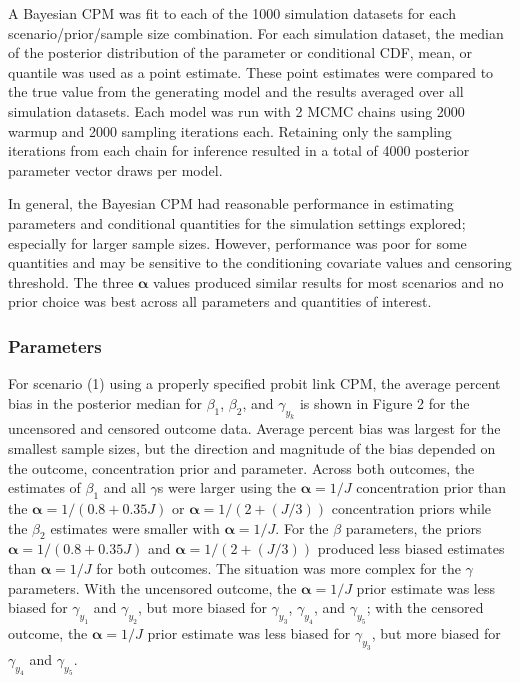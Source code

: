 \documentclass[
]{article}
\begin{document}
A Bayesian CPM was fit to each of the 1000 simulation datasets for each scenario/prior/sample size combination. For each simulation dataset, the median of the posterior distribution of the parameter or conditional CDF, mean, or quantile was used as a point estimate. These point estimates were compared to the true value from the generating model and the results averaged over all simulation datasets. Each model was run with 2 MCMC chains using 2000 warmup and 2000 sampling iterations each. Retaining only the sampling iterations from each chain for inference resulted in a total of 4000 posterior parameter vector draws per model.

In general, the Bayesian CPM had reasonable performance in estimating parameters and conditional quantities for the simulation settings explored; especially for larger sample sizes. However, performance was poor for some quantities and may be sensitive to the conditioning covariate values and censoring threshold. The three \(\boldsymbol{\alpha}\) values produced similar results for most scenarios and no prior choice was best across all parameters and quantities of interest.

\hypertarget{parameters}{%
\subsubsection{Parameters}\label{parameters}}

For scenario (1) using a properly specified probit link CPM, the average percent bias in the posterior median for \(\beta_1\), \(\beta_2\), and \(\gamma_{y_k}\) is shown in Figure 2 for the uncensored and censored outcome data. Average percent bias was largest for the smallest sample sizes, but the direction and magnitude of the bias depended on the outcome, concentration prior and parameter. Across both outcomes, the estimates of \(\beta_1\) and all \(\gamma\)s were larger using the \(\boldsymbol{\alpha}=1/J\) concentration prior than the \(\boldsymbol{\alpha}=1/(0.8+0.35J)\) or \(\boldsymbol{\alpha}=1/(2+(J/3))\) concentration priors while the \(\beta_2\) estimates were smaller with \(\boldsymbol{\alpha}=1/J\). For the \(\beta\) parameters, the priors \(\boldsymbol{\alpha}=1/(0.8+0.35J)\) and \(\boldsymbol{\alpha}=1/(2+(J/3))\) produced less biased estimates than \(\boldsymbol{\alpha}=1/J\) for both outcomes. The situation was more complex for the \(\gamma\) parameters. With the uncensored outcome, the \(\boldsymbol{\alpha}=1/J\) prior estimate was less biased for \(\gamma_{y_1}\) and \(\gamma_{y_2}\), but more biased for \(\gamma_{y_3}\), \(\gamma_{y_4}\), and \(\gamma_{y_5}\); with the censored outcome, the \(\boldsymbol{\alpha}=1/J\) prior estimate was less biased for \(\gamma_{y_3}\), but more biased for \(\gamma_{y_4}\) and \(\gamma_{y_5}\).
\end{document}
